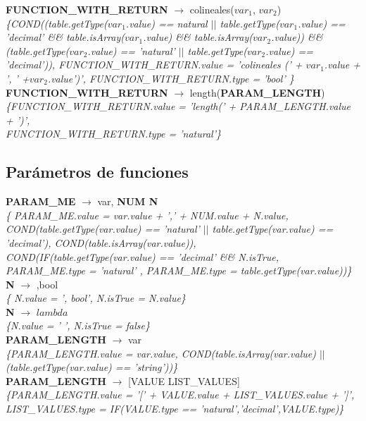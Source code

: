 \documentclass[10pt,a4paper]{article}
\begin{document}
\textbf{FUNCTION\_WITH\_RETURN} $\rightarrow$ colineales($var_{1}$, $var_{2}$)   \\
\textit{\{COND((table.getType($var_{1}$.value) == natural $||$ table.getType($var_{1}$.value) == 'decimal' \&\& table.isArray($var_{1}$.value) \&\& table.isArray($var_{2}$.value)) \&\&
(table.getType($var_{2}$.value) == 'natural' $||$ table.getType($var_{2}$.value) == 'decimal')), FUNCTION\_WITH\_RETURN.value = 'colineales (' + $var_{1}$.value + ', ' +$var_{2}$.value')', FUNCTION\_WITH\_RETURN.type = 'bool' \}} \\

\textbf{FUNCTION\_WITH\_RETURN} $\rightarrow$ length(\textbf{PARAM\_LENGTH}) \\
\textit{\{FUNCTION\_WITH\_RETURN.value =  'length(' + PARAM\_LENGTH.value + ')',\\ 
FUNCTION\_WITH\_RETURN.type = 'natural'\}} \\

\subsection{Parámetros de funciones}
\textbf{PARAM\_ME} $\rightarrow$ var, \textbf{NUM N} \\
\textit{\{ PARAM\_ME.value = var.value + ',' + NUM.value + N.value, COND(table.getType(var.value) == 'natural' $||$ table.getType(var.value) == 'decimal'), COND(table.isArray(var.value)),\\
COND(IF(table.getType(var.value) == 'decimal' \&\& N.isTrue, PARAM\_ME.type = 'natural' , PARAM\_ME.type = table.getType(var.value))\}} \\

\textbf{N} $\rightarrow$ ,bool \\
\textit{\{ N.value = ', bool', N.isTrue = N.value\}} \\ 

\textbf{N} $\rightarrow$ $lambda$  \\
\textit{\{N.value = ' ', N.isTrue = false\}} \\

\textbf{PARAM\_LENGTH} $\rightarrow$ var \\
\textit{\{PARAM\_LENGTH.value = var.value, COND(table.isArray(var.value) $||$ (table.getType(var.value) == 'string'))\}} \\

\textbf{PARAM\_LENGTH} $\rightarrow$ [VALUE LIST\_VALUES]\\
\textit{\{PARAM\_LENGTH.value = '[' + VALUE.value + LIST\_VALUES.value + ']', LIST\_VALUES.type = IF(VALUE.type == 'natural','decimal',VALUE.type)\}} \\
\end{document}
